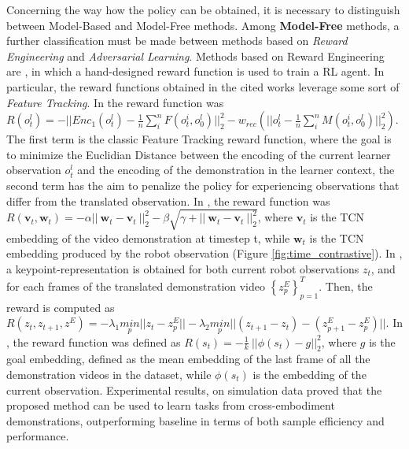 Concerning the way how the policy can be obtained, it is necessary to distinguish between Model-Based and Model-Free methods. 
\newline Among \textbf{Model-Free} methods, a further classification must be made between methods based on \textit{Reward Engineering} and \textit{Adversarial Learning}.
\newline Methods based on Reward Engineering are \cite{liu2018imitation_from_observation,sermanet2018time_contrastive,xiong2021learning_by_watching,zakka2022xirl}, in which a hand-designed reward function is used to train a RL agent. In particular, the reward functions obtained in the cited works leverage some sort of \textit{Feature Tracking}. In \cite{liu2018imitation_from_observation} the reward function was $R(o^{l}_{t}) = -||Enc_{1}(o^{l}_{t}) - \frac{1}{n} \sum_{i}^{n}F(o_{t}^{i},o_{0}^{l})||^{2}_{2} - w_{rec} (||o^{l}_{t} - \frac{1}{n} \sum_{i}^{n}M(o_{t}^{i},o_{0}^{l})||^{2}_{2})$. The first term is the classic Feature Tracking reward function, where the goal is to minimize the Euclidian Distance between the encoding of the current learner observation $o^{l}_{t}$ and the encoding of the demonstration in the learner context, the second term has the aim to penalize the policy for experiencing observations that differ from the translated observation.
In \cite{sermanet2018time_contrastive}, the reward function was $R(\textbf{v}_{t}, \textbf{w}_{t}) = - \alpha || \ \textbf{w}_{t} - \textbf{v}_{t} \ ||^{2}_{2} - \beta \sqrt{\gamma + || \ \textbf{w}_{t} - \textbf{v}_{t} \ ||^{2}_{2}}$, where $\textbf{v}_{t}$ is the TCN embedding of the video demonstration at timestep t, while $\textbf{w}_{t}$ is the TCN embedding produced by the robot observation (Figure \ref{fig:time_contrastive}).
In \cite{xiong2021learning_by_watching}, a keypoint-representation is obtained for both current robot observations $z_{t}$, and for each frames of the translated demonstration video $\left\{z^{E}_{p}\right\}_{p=1}^{T}$. Then, the reward is computed as $R(z_{t},z_{t+1},z^{E}) = - \lambda_{1} \underset{p}{min} ||z_{t}-z^{E}_{p}|| - \lambda_{2} \underset{p}{min} ||(z_{t+1}-z_{t}) - (z^{E}_{p+1}-z^{E}_{p})||$. %
In \cite{zakka2022xirl}, the reward function was defined as $R(s_{t}) = -\frac{1}{k} \ || \phi(s_{t}) - g||^{2}_{2}$, where $g$ is the goal embedding, defined as the mean embedding of the last frame of all the demonstration videos in the dataset, while $\phi(s_{t})$ is the embedding of the current observation. Experimental results, on simulation data proved that the proposed method can be used to learn tasks from cross-embodiment demonstrations, outperforming baseline \cite{sermanet2018time_contrastive} in terms of both sample efficiency and performance.%
